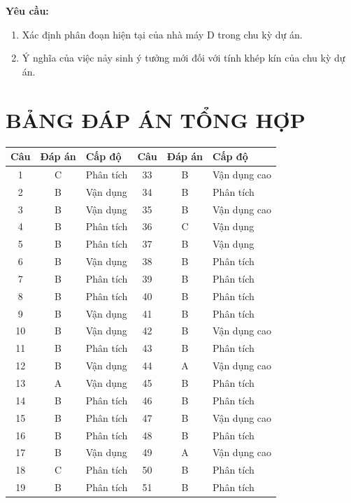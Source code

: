 \textbf{Yêu cầu:}
\begin{enumerate}[label=\alph*)]
    \item Xác định phân đoạn hiện tại của nhà máy D trong chu kỳ dự án.
    \item Ý nghĩa của việc nảy sinh ý tưởng mới đối với tính khép kín của chu kỳ dự án.
\end{enumerate}

\newpage
\section{BẢNG ĐÁP ÁN TỔNG HỢP}

\begin{longtable}{|c|c|m{3cm}|c|c|m{3cm}|}
\hline
\textbf{Câu} & \textbf{Đáp án} & \textbf{Cấp độ} & \textbf{Câu} & \textbf{Đáp án} & \textbf{Cấp độ} \\ \hline
1 & C & Phân tích & 33 & B & Vận dụng cao \\ \hline
2 & B & Vận dụng & 34 & B & Phân tích \\ \hline
3 & B & Vận dụng & 35 & B & Vận dụng cao \\ \hline
4 & B & Phân tích & 36 & C & Vận dụng \\ \hline
5 & B & Phân tích & 37 & B & Vận dụng \\ \hline
6 & B & Vận dụng & 38 & B & Phân tích \\ \hline
7 & B & Phân tích & 39 & B & Phân tích \\ \hline
8 & B & Phân tích & 40 & B & Phân tích \\ \hline
9 & B & Vận dụng & 41 & B & Phân tích \\ \hline
10 & B & Vận dụng & 42 & B & Vận dụng cao \\ \hline
11 & B & Phân tích & 43 & B & Phân tích \\ \hline
12 & B & Vận dụng & 44 & A & Vận dụng cao \\ \hline
13 & A & Vận dụng & 45 & B & Phân tích \\ \hline
14 & B & Phân tích & 46 & B & Phân tích \\ \hline
15 & B & Phân tích & 47 & B & Vận dụng cao \\ \hline
16 & B & Phân tích & 48 & B & Phân tích \\ \hline
17 & B & Vận dụng & 49 & A & Vận dụng cao \\ \hline
18 & C & Phân tích & 50 & B & Phân tích \\ \hline
19 & B & Phân tích & 51 & B & Phân tích \\ \hline

\end{longtable}
